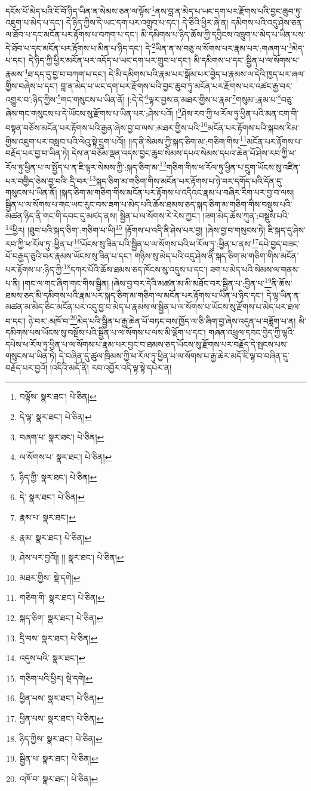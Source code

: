 དངོས་པོ་མེད་པའི་ངོ་བོ་ཉིད་ཡིན་ན་སེམས་ཅན་ལ་ལྟོས་\footnote{བལྟོས་  སྣར་ཐང་།  པེ་ཅིན། }ནས་བླ་ན་མེད་པ་ཡང་དག་པར་རྫོགས་པའི་བྱང་ཆུབ་ཏུ་འཇུག་པ་མེད་པ་དང་། དེ་ཉིད་ཀྱིས་དེ་ཡང་དག་པར་འགྲུབ་པ་དང་། དེ་ཅིའི་ཕྱིར་ཞེ་ན། དམིགས་པའི་འདུ་ཤེས་ཅན་ལ་ཐོབ་པ་དང་མངོན་པར་རྟོགས་པ་བཀག་པ་དང་། མི་དམིགས་པ་ཉིད་ཆོས་ཀྱི་དབྱིངས་འཁྲུག་པ་མེད་པ་ཡིན་པས་དེ་ཐོབ་པ་དང་མངོན་པར་རྟོགས་པ་མིན་པ་ཉིད་དང་། དེ་\footnote{དེ་ལྟ་  སྣར་ཐང་།  པེ་ཅིན། }ཡིན་ན་ས་བཅུ་ལ་སོགས་པར་རྣམ་པར་:གཞག་པ་\footnote{བཞག་པ་  སྣར་ཐང་།  པེ་ཅིན། }མེད་པ་དང་། དེ་ཉིད་ཀྱི་ཕྱིར་མངོན་པར་འདོད་པ་ཡང་དག་པར་གྲུབ་པ་དང་། མི་དམིགས་པ་དང་:སྦྱིན་པ་ལ་སོགས་པ་རྣམས་\footnote{ལ་སོགས་པ་  སྣར་ཐང་།  པེ་ཅིན། }ཐ་དད་དུ་བྱ་བ་བཀག་པ་དང་། དེ་མི་དམིགས་པའི་རྣམ་པར་སྒོམ་པར་བྱེད་པ་རྣམས་ལ་དེའི་ཁྱད་པར་ཞལ་གྱིས་བཞེས་པ་དང་། བླ་ན་མེད་པ་ཡང་དག་པར་རྫོགས་པའི་བྱང་ཆུབ་ཏུ་མངོན་པར་རྫོགས་པར་འཚང་རྒྱ་བར་འགྱུར་བ་:ཉིད་ཀྱིས་\footnote{ཉིད་ཀྱི་  སྣར་ཐང་།  པེ་ཅིན། }གང་གསུངས་པ་ཡིན་ནོ། །:དེ་དེ་\footnote{དེ་  སྣར་ཐང་།  པེ་ཅིན། }ལྟར་བྱས་ན་མཐར་གྱིས་པ་རྣམ་\footnote{རྣམ་པ་  སྣར་ཐང་། }གསུམ་:རྣམ་པ་\footnote{རྣམ་  སྣར་ཐང་།  པེ་ཅིན། }བཅུ་ཞེས་གང་གསུངས་པ་དེ་ཡོངས་སུ་རྫོགས་པ་ཡིན་པར་:ཤེས་པའོ། །\footnote{ཤེས་པར་བྱའོ།། །།  སྣར་ཐང་།  པེ་ཅིན། }ཤེས་རབ་ཀྱི་ཕ་རོལ་ཏུ་ཕྱིན་པའི་མན་ངག་གི་བསྟན་བཅོས་མངོན་པར་རྟོགས་པའི་རྒྱན་ཞེས་བྱ་བ་ལས་:མཐར་གྱིས་པའི་\footnote{མཐར་གྱིས་  སྡེ་དགེ། }མངོན་པར་རྟོགས་པའི་སྐབས་རིམ་གྱིས་འཇུག་པར་བསླབ་པའི་ལེའུ་སྟེ་དྲུག་པའོ།། །།ད་ནི་སེམས་ཀྱི་སྐད་ཅིག་མ་:གཅིག་གིས་\footnote{གཅིག་གི་  སྣར་ཐང་།  པེ་ཅིན། }མངོན་པར་རྟོགས་པ་བརྗོད་པར་བྱ་བ་ཡིན་ཏེ། དེས་ན་བཅོམ་ལྡན་འདས་བྱང་ཆུབ་སེམས་དཔའ་སེམས་དཔའ་ཆེན་པོ་ཤེས་རབ་ཀྱི་ཕ་རོལ་ཏུ་ཕྱིན་པ་ལ་སྤྱོད་པ་ན་ཇི་ལྟར་སེམས་ཀྱི་:སྐད་ཅིག་མ་\footnote{སྐད་ཅིག་  སྣར་ཐང་།  པེ་ཅིན། }གཅིག་གིས་ཕ་རོལ་ཏུ་ཕྱིན་པ་དྲུག་ཡོངས་སུ་འཛིན་པར་བགྱིད་ཅེས་བྱ་བའི་:དྲི་བར་\footnote{དྲི་བས་  སྣར་ཐང་།  པེ་ཅིན། }སྐད་ཅིག་མ་གཅིག་གིས་མངོན་པར་རྟོགས་པ་ཉེ་བར་དགོད་པའི་དོན་དུ་གསུངས་པ་ཡིན་ནོ། །སྐད་ཅིག་མ་གཅིག་གིས་མངོན་པར་རྟོགས་པ་འདིའང་རྣམ་པ་བཞིར་རིག་པར་བྱ་བ་ལས། སྦྱིན་པ་ལ་སོགས་པ་གང་ཡང་རུང་བས་ཟག་པ་མེད་པའི་ཆོས་ཐམས་ཅད་སྐད་ཅིག་མ་གཅིག་གིས་བསྡུས་པའི་མཚན་ཉིད་ནི་གང་གི་དབང་དུ་མཛད་ནས། སྦྱིན་པ་ལ་སོགས་རེ་རེས་ཀྱང་། །ཟག་མེད་ཆོས་ཀུན་:བསྡུས་པའི་\footnote{འདུས་པའི་  སྣར་ཐང་། }ཕྱིར། །ཐུབ་པའི་སྐད་ཅིག་:གཅིག་པ་ཡི།\footnote{གཅིག་པའི་ཕྱིར།  སྡེ་དགེ། } །རྟོགས་པ་འདི་ནི་ཤེས་པར་བྱ། །ཞེས་བྱ་བ་གསུངས་ཏེ། ཇི་སྐད་དུ་ཤེས་རབ་ཀྱི་ཕ་རོལ་ཏུ་:ཕྱིན་པ་\footnote{ཕྱིན་པས་  སྣར་ཐང་།  པེ་ཅིན། }ཡོངས་སུ་ཟིན་པའི་སྦྱིན་པ་ལ་སོགས་པའི་ཕ་རོལ་ཏུ་:ཕྱིན་པ་ནས་\footnote{ཕྱིན་པས་  སྣར་ཐང་།  པེ་ཅིན། }དཔེ་བྱད་བཟང་པོ་བརྒྱད་ཅུའི་བར་རྣམས་ཡོངས་སུ་ཟིན་པ་དང་། གཉིས་སུ་མེད་པའི་འདུ་ཤེས་ནི་སྐད་ཅིག་མ་གཅིག་གིས་མངོན་པར་རྟོགས་པ་:ཉིད་ཀྱི་\footnote{ཉིད་ཀྱིས་  སྣར་ཐང་།  པེ་ཅིན། }དཀར་པོའི་ཆོས་ཐམས་ཅད་ཁོངས་སུ་འདུས་པ་དང་། ཟག་པ་མེད་པའི་སེམས་ལ་གནས་པ་ནི། །གང་ལ་གང་ཞིག་གང་གིས་སྦྱིན། །ཞེས་བྱ་བར་དེའི་མཚན་མ་མི་མཐོང་བར་སྦྱིན་པ་:བྱིན་པ་\footnote{སྦྱིན་པ་  སྣར་ཐང་།  པེ་ཅིན། }ནི་ཆོས་ཐམས་ཅད་མི་དམིགས་པའི་རྣམ་པར་སྐད་ཅིག་མ་གཅིག་ལ་མངོན་པར་རྟོགས་པ་ཡིན་པ་ཉིད་དང་། དེ་ལྟ་ཡིན་ན་མཚན་མ་མེད་ཅིང་མངོན་པར་འདུ་བྱ་བ་མེད་པ་རྣམས་ལ་སྦྱིན་པ་ལ་སོགས་པ་ཡོངས་སུ་རྫོགས་པ་མེད་པར་ཐལ་བ་དང་། ཉེ་བར་:མཁོ་བ་\footnote{འཁོ་བ་  སྣར་ཐང་།  པེ་ཅིན། }མེད་པའི་སྦྱིན་པ་རྒྱ་ཆེན་པོ་བཏང་བས་ཁྱོད་ལ་ཅི་ཞིག་བྱ་ཞེས་འདུན་པ་བཟློག་པ་ན། མི་དམིགས་པས་ཡོངས་སུ་བསྔོས་པའི་སྦྱིན་པ་ལ་སོགས་པ་ལས་མི་ལྡོག་པ་དང་། གཞན་འཕྲུལ་དབང་བྱེད་ཀྱི་ལྷའི་དཔེས་ཕ་རོལ་ཏུ་ཕྱིན་པ་ལ་སོགས་པ་རྣམ་པར་བྱང་བ་ཐམས་ཅད་ཡོངས་སུ་རྫོགས་པར་བརྗོད་དེ་སྤངས་པས་གསུངས་པ་ཡིན་ཏེ། དེ་བཞིན་དུ་ཚུལ་ཁྲིམས་ཀྱི་ཕ་རོལ་ཏུ་ཕྱིན་པ་ལ་སོགས་པ་རྒྱ་ཆེར་མདོ་ཇི་ལྟ་བ་བཞིན་དུ་བརྗོད་པར་བྱའོ། །འདིའི་མདོ་ནི། རབ་འབྱོར་འདི་ལྟ་སྟེ་དཔེར་ན། 